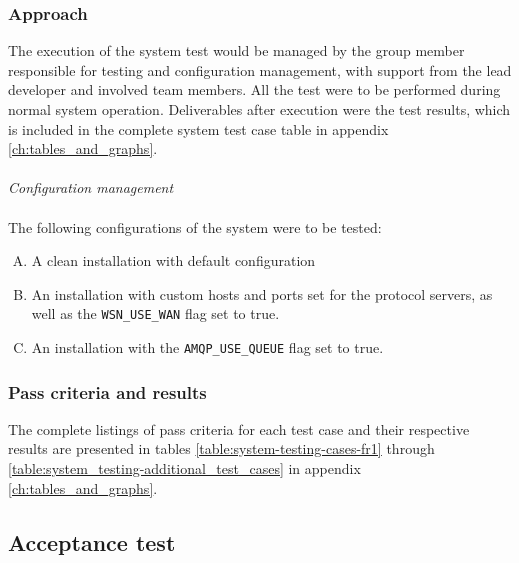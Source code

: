 \subsubsection{Approach}

The execution of the system test would be managed by the group member responsible for testing and configuration management, with support from the lead developer and involved team members. All the test were to be performed during normal system operation. Deliverables after execution were the test results, which is included in the complete system test case table in appendix \ref{ch:tables_and_graphs}. \\
\\
\textit{Configuration management}
\\
\\
The following configurations of the system were to be tested:
\begin{enumerate}[A.]
\item A clean installation with default configuration
\item An installation with custom hosts and ports set for the protocol servers, as well as the \verb!WSN_USE_WAN! flag set to true.
\item An installation with the \verb!AMQP_USE_QUEUE! flag set to true.
\end{enumerate}

\subsubsection{Pass criteria and results}

The complete listings of pass criteria for each test case and their respective results are presented in tables \ref{table:system-testing-cases-fr1} through \ref{table:system_testing-additional_test_cases} in appendix \ref{ch:tables_and_graphs}.

\subsection{Acceptance test}
\label{subsec:testing-test_execution-acceptance_test}

